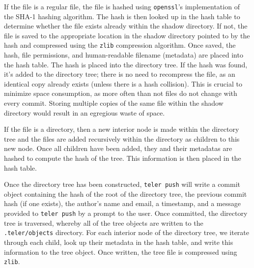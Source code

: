 \documentclass[12pt, letterpaper]{article}
\begin{document}
\begin{multicols}{2}
  If the file is a regular file, the file is hashed using
  \texttt{openssl}'s implementation of the SHA-1 hashing algorithm.
  The hash is then looked up in the hash table to determine whether
  the file exists already within the shadow directory. If not, the
  file is saved to the appropriate location in the shadow
  directory pointed to by the hash and compressed using the \texttt{zlib}
  compression algorithm. Once saved, the hash, file
  permissions, and human-readable filename (metadata) are placed into the hash
  table. The hash is placed into the directory tree. If the hash was found,
  it's added to the directory tree; there is no need
  to recompress the file, as an identical copy already exists (unless
  there is a hash collision). This is crucial to minimize space
  consumption, as more often than not files do not change with every
  commit. Storing multiple copies of the same file within the
  shadow directory would result in an egregious waste of space.

  If the file is a directory, then a new interior node is made
  within the directory tree and the files are added recursively within the
  directory as children to this new node. Once all children have
  been added, they and their metadatas are hashed to compute the hash of
  the tree. This information is then placed in the hash table.

  Once the directory tree has been constructed, \texttt{teler push}
  will write a commit object containing the hash of the root of the
  directory tree, the previous commit hash (if one exists), the
  author's name and email, a timestamp, and a message provided
  to \texttt{teler push} by a prompt to the user. Once committed, the
  directory tree is traversed, whereby all of the tree objects are
  written to the \texttt{.teler/objects} directory. For each interior
  node of the directory tree, we iterate through each child, look up
  their metadata in the hash table, and write this information to
  the tree object. Once written, the tree file is compressed using
  \texttt{zlib}.

  \begin{center}
    \begin{minipage}{.2\textwidth}
\end{minipage}
\end{center}
\end{multicols}
\end{document}
